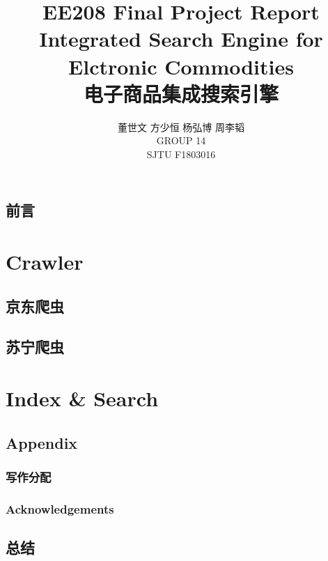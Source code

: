 \documentclass{book}
\begin{document}
\title{EE208 Final Project Report \\ Integrated Search Engine for Elctronic Commodities \\ 电子商品集成搜索引擎}

\author{董世文 \quad 方少恒 \quad  杨弘博 \quad  周李韬 \\ GROUP 14 \\ SJTU F1803016} %

\maketitle 

\tableofcontents 

\mainmatter %


\frontmatter

\chapter{前言}


\mainmatter


\part{Crawler}

\chapter{京东爬虫}
% 

% 


\chapter{苏宁爬虫}
% 

% 





\part{Index \& Search}



\backmatter

\chapter{Appendix}

\section*{写作分配}

\section*{Acknowledgements}

\chapter{总结}
\end{document}
